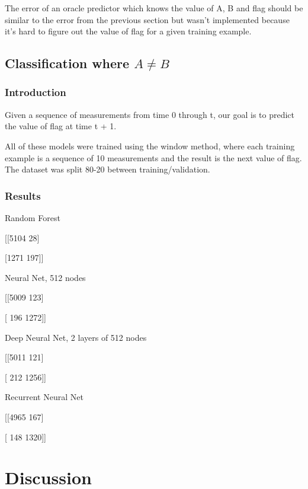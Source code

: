 \documentclass[12pt]{article}
\renewcommand{\=}[1]{\stackrel{#1}{=}} %
\theoremstyle{definition}
\begin{document}
The error of an oracle predictor which knows the value of A, B and flag should be similar to the error from the previous section but wasn't implemented because it's hard to figure out the value of flag for a given training example.  


\subsection{Classification where $A \neq B$}
\subsubsection{Introduction}
Given a sequence of measurements from time 0 through t, our goal is to predict the value of flag at time t + 1.  

All of these models were trained using the window method, where each training example is a sequence of 10 measurements and the result is the next value of flag.  The dataset was split 80-20 between training/validation.
\subsubsection{Results}
Random Forest 

[[5104   28] 

 [1271  197]] 
 
Neural Net, 512 nodes

[[5009  123]

 [ 196 1272]]

Deep Neural Net, 2 layers of 512 nodes

[[5011  121]

 [ 212 1256]]
 
Recurrent Neural Net 

[[4965  167]

 [ 148 1320]]
 
\section{Discussion}


 
\end{document}
